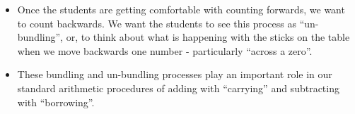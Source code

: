 \documentclass[nooutcomes]{ximera}
\begin{document}
\begin{instructorNotes}
\begin{itemize}
	\item Once the students are getting comfortable with counting forwards, we want to count backwards.  We want the students to see this process as ``un-bundling'', or, to think about what is happening with the sticks on the table when we move backwards one number - particularly ``across a zero''. 
	\item These bundling and un-bundling processes play an important role in our standard arithmetic procedures of adding with ``carrying'' and subtracting with ``borrowing''. 
\end{itemize}







\end{instructorNotes}
\end{document}
